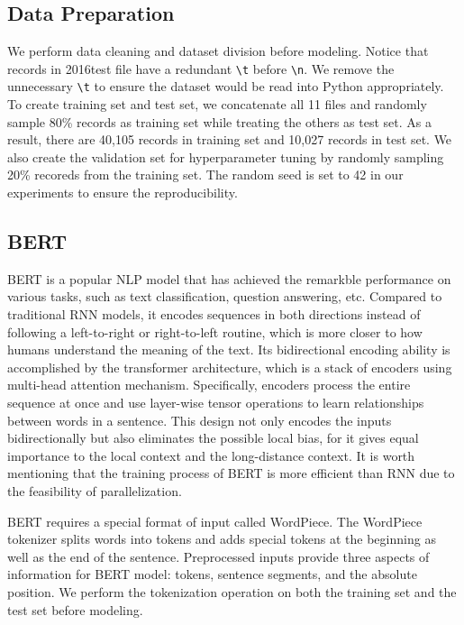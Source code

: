 \documentclass[runningheads]{llncs}
\begin{document}
\subsection{Data Preparation}
We perform data cleaning and dataset division before modeling. Notice that records in 2016test file have a redundant \texttt{\textbackslash t} before \texttt{\textbackslash n}. We remove the unnecessary \texttt{\textbackslash t} to ensure the dataset would be read into Python appropriately. To create training set and test set, we concatenate all 11 files and randomly sample 80\% records as training set while treating the others as test set. As a result, there are 40,105 records in training set and 10,027 records in test set. We also create the validation set for hyperparameter tuning by randomly sampling 20\% recoreds from the training set. The random seed is set to 42 in our experiments to ensure the reproducibility.

\subsection{BERT}
BERT \cite{bert} is a popular NLP model that has achieved the remarkble performance on various tasks, such as text classification, question answering, etc. Compared to traditional RNN models, it encodes sequences in both directions instead of following a left-to-right or right-to-left routine, which is more closer to how humans understand the meaning of the text. Its bidirectional encoding ability is accomplished by the transformer architecture, which is a stack of encoders using multi-head attention mechanism. Specifically, encoders process the entire sequence at once and use layer-wise tensor operations to learn relationships between words in a sentence. This design not only encodes the inputs bidirectionally but also eliminates the possible local bias, for it gives equal importance to the local context and the long-distance context. It is worth mentioning that the training process of BERT is more efficient than RNN due to the feasibility of parallelization.

BERT requires a special format of input called WordPiece. The WordPiece tokenizer splits words into tokens and adds special tokens at the beginning as well as the end of the sentence. Preprocessed inputs provide three aspects of information for BERT model: tokens, sentence segments, and the absolute position. We perform the tokenization operation on both the training set and the test set before modeling.
\end{document}
